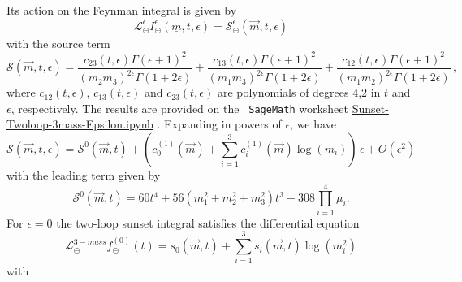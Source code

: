 \documentclass[a4paper,12pt]{article}
\numberwithin{equation}{section}
\numberwithin{figure}{section}
\def\su{\circleddash}
\begin{document}
Its action on the Feynman integral is given by 
\begin{equation}
     \mathscr{L}^{\epsilon}_\su  I_\su^\epsilon(\underline
     m,t,\epsilon)=\mathscr{S}^\epsilon_\su(\vec m,t,\epsilon) 
   \end{equation}
   with the source term
   \begin{equation}
     \mathscr{S}(\vec m,t,\epsilon)=\frac{c_{23}(t,\epsilon)\Gamma (\epsilon +1)^2}{ (m_{2} m_{3})^{2 \epsilon}\Gamma (1+2\epsilon)}+\frac{c_{13}(t,\epsilon)\Gamma (\epsilon +1)^2}{ (m_{1} m_{3})^{2 \epsilon }\Gamma (1+2
   \epsilon)}+\frac{c_{12}(t,\epsilon)\Gamma (\epsilon +1)^2}{ (m_{1} m_{2})^{2 \epsilon }\Gamma (1+2
   \epsilon )} \, , 
\end{equation}
where $c_{12}(t,\epsilon)$, $c_{13}(t,\epsilon)$ and
$c_{23}(t,\epsilon)$ are polynomials of degrees 4,2 in $t$ and
$\epsilon$, respectively. The results are provided on the {\tt
  SageMath} worksheet \href{Sunset-Twoloop-3mass-Epsilon.ipynb}{Sunset-Twoloop-3mass-Epsilon.ipynb} .
%
Expanding in powers of $\epsilon$, we have
%
\begin{equation}
    \mathscr{S}(\vec m,t,\epsilon)=\mathscr{S}^0(\vec m,t)
    +\left(c^{(1)}_0(\vec m)+
    \sum_{i=1}^3  c^{(1)}_i(\vec m)\log(m_i)\right)\,  \epsilon+O(\epsilon^2)
\end{equation}
with  the leading term given by
   \begin{equation}
   \mathscr{S}^0(\vec m,t)=60 t^{4}+56\left( m_{1}^{2}+ m_{2}^{2}+
     m_{3}^{2}\right) t^{3}
   -308 \prod_{i=1}^4 \mu_i.
 \end{equation}
For $\epsilon=0$ the two-loop sunset integral satisfies  the
differential equation~\cite{Adams:2013nia,Bloch:2016izu}
\begin{equation}
  \mathscr{L}^{3-mass}_\su f_\su^{(0)}(t)= s_0(\vec m,t)+ \sum_{i=1}^3
  s_i(\vec m,t)\log(m_i^2)  
\end{equation}
with 
\end{document}
